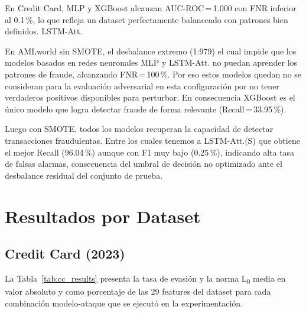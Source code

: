 En Credit Card, MLP y XGBoost alcanzan AUC-ROC\,=\,1.000 con FNR inferior al 0.1\,\%, lo que refleja un dataset perfectamente balanceado con patrones bien definidos. LSTM-Att.

En AMLworld sin SMOTE, el desbalance extremo (1:979) el cual impide que los modelos basados en redes neuronales MLP y LSTM-Att. no puedan aprender los patrones de fraude, alcanzando FNR\,=\,100\,\%. Por eso estos modelos quedan no se consideran para la evaluación adversarial en esta configuración por no tener verdaderos positivos disponibles para perturbar. En consecuencia XGBoost es el único modelo que logra detectar fraude de forma relevante (Recall\,=\,33.95\,\%).

Luego con SMOTE, todos los modelos recuperan la capacidad de detectar transacciones fraudulentas. Entre los cuales tenemos a LSTM-Att.(S) que obtiene el mejor Recall (96.04\,\%) aunque con F1 muy bajo (0.25\,\%), indicando alta tasa de falsas alarmas, consecuencia del umbral de decisión no optimizado ante el desbalance residual del conjunto de prueba.

\section{Resultados por Dataset}

\subsection{Credit Card (2023)}

La Tabla~\ref{tab:cc_results} presenta la tasa de evasión y la norma L\textsubscript{0} media en valor absoluto y como porcentaje de las 29 features del dataset para cada combinación modelo-ataque que se ejecutó en la experimentación.

